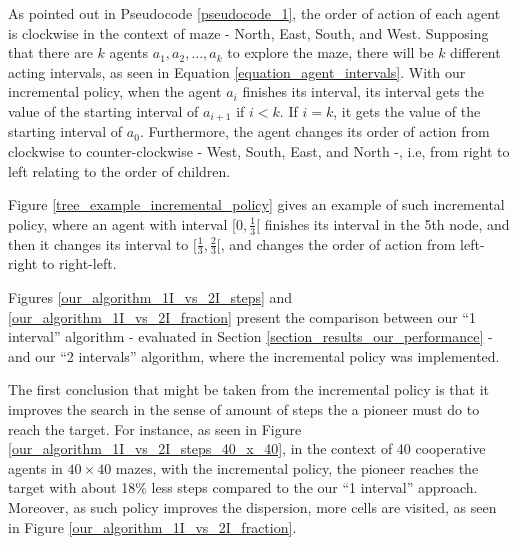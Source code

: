 As pointed out in Pseudocode \ref{pseudocode_1}, the order of action of each agent is clockwise in the context of maze - North, East, South, and West. Supposing that there are $k$ agents $a_{1}, a_{2},...,a_{k}$ to explore the maze, there will be $k$ different acting intervals, as seen in Equation \ref{equation_agent_intervals}. With our incremental policy, when the agent $a_{i}$ finishes its interval, its interval gets the value of the starting interval of $a_{i+1}$ if $i < k$. If $i = k$, it gets the value of the starting interval of $a_{0}$. Furthermore, the agent changes its order of action from clockwise to counter-clockwise - West, South, East, and North -, i.e, from right to left relating to the order of children.

Figure \ref{tree_example_incremental_policy} gives an example of such incremental policy, where an agent with interval $[0, \frac{1}{3}[$ finishes its interval in the 5th node, and then it changes its interval to $[\frac{1}{3}, \frac{2}{3}[$, and changes the order of action from left-right to right-left.

Figures \ref{our_algorithm_1I_vs_2I_steps} and \ref{our_algorithm_1I_vs_2I_fraction} present the comparison between our ``1 interval'' algorithm - evaluated in Section \ref{section_results_our_performance} - and our ``2 intervals'' algorithm, where the incremental policy was implemented.

The first conclusion that might be taken from the incremental policy is that it improves the search in the sense of amount of steps the a pioneer must do to reach the target. For instance, as seen in Figure \ref{our_algorithm_1I_vs_2I_steps_40_x_40}, in the context of 40 cooperative agents in $40 \times 40$ mazes, with the incremental policy, the pioneer reaches the target with about 18\% less steps compared to the our ``1 interval'' approach. Moreover, as such policy improves the dispersion, more cells are visited, as seen in Figure \ref{our_algorithm_1I_vs_2I_fraction}.

